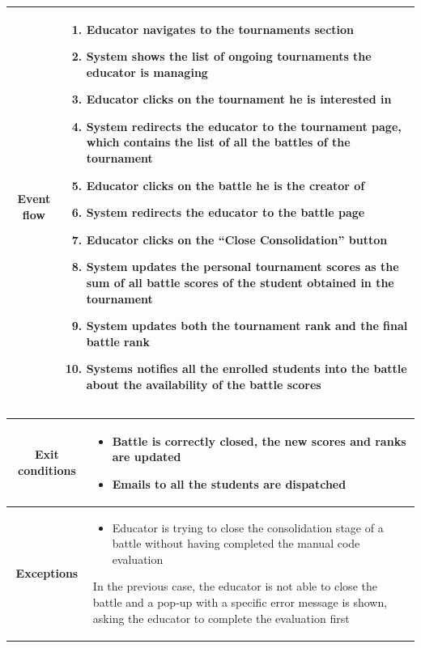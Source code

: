 \begin{center}
\begin{tabular}{ |c|m{10cm}| }
        \hline
        \textbf{Event flow} &
        \begin{enumerate}
            \item Educator navigates to the tournaments section
            \item System shows the list of ongoing tournaments the educator is managing
            \item Educator clicks on the tournament he is interested in
            \item System redirects the educator to the tournament page, which contains the list of all the battles of the tournament
            \item Educator clicks on the battle he is the creator of
            \item System redirects the educator to the battle page
            \item Educator clicks on the “Close Consolidation” button
            \item System updates the personal tournament scores as the sum of all battle scores of the student obtained in the tournament
            \item System updates both the tournament rank and the final battle rank
            \item Systems notifies all the enrolled students into the battle about the availability of the battle scores
        \end{enumerate} \\
        \hline
    \end{tabular}
    \newpage
    \begin{tabular}{ |c|m{10cm}| }
        \hline
        \textbf{Exit conditions} &
        \begin{itemize}
            \item Battle is correctly closed, the new scores and ranks are updated
            \item Emails to all the students are dispatched
        \end{itemize} \\
        \hline
        \textbf{Exceptions} & 
        \begin{itemize}
            \item Educator is trying to close the consolidation stage of a battle without having completed the manual code evaluation
        \end{itemize} 
        In the previous case, the educator is not able to close the battle and a pop-up with a specific error message is shown, asking the educator to complete the evaluation first \\

\end{tabular}
\end{center}
